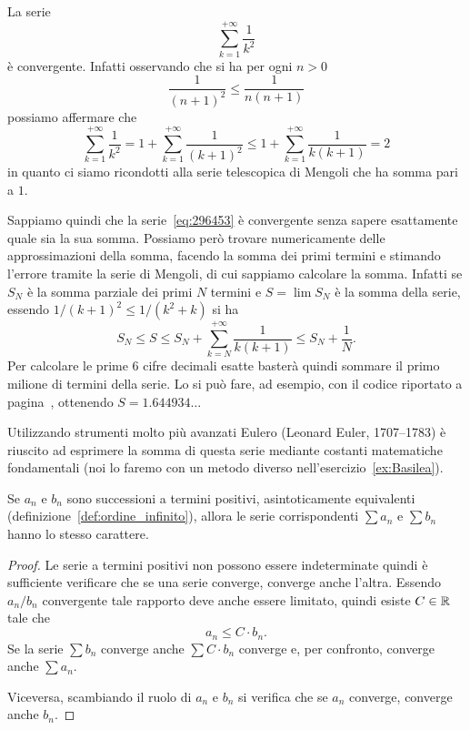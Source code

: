 \begin{example}\label{ex:52573}
\mymark{***}
La serie
\begin{equation}\label{eq:296453}
 \sum_{k=1}^{+\infty} \frac{1}{k^2}
\end{equation}
è convergente.
Infatti osservando che si ha per ogni $n>0$
\[
  \frac{1}{(n+1)^2} \le \frac{1}{n(n+1)}
\]
possiamo affermare che
\[
  \sum_{k=1}^{+\infty} \frac{1}{k^2}
  = 1 + \sum_{k=1}^{+\infty} \frac{1}{(k+1)^2}
  \le 1+ \sum_{k=1}^{+\infty} \frac{1}{k(k+1)}
  = 2
\]
in quanto ci siamo ricondotti alla
serie telescopica di Mengoli che ha somma pari a $1$.

Sappiamo quindi che la serie~\eqref{eq:296453} è convergente
senza sapere esattamente quale sia la sua somma.
Possiamo però trovare numericamente delle approssimazioni
della somma, facendo la somma dei primi termini
e stimando l'errore tramite la serie di Mengoli,
di cui sappiamo calcolare la somma.
Infatti se $S_N$ è la somma parziale dei primi
$N$ termini e $S = \lim S_N$ è la somma della serie,
essendo $1/(k+1)^2 \le 1/(k^2+k)$ si ha
\[
S_N
\le S
\le S_N + \sum_{k=N}^{+\infty} \frac{1}{k(k+1)}
\le S_N + \frac{1}{N}.
\]
Per calcolare le prime 6 cifre decimali esatte basterà
quindi sommare il primo milione di termini della serie.
Lo si può fare, ad esempio, con il codice riportato
a pagina~\pageref{code:series}, ottenendo $S=1.644934\ldots$

Utilizzando strumenti molto più avanzati
Eulero 
(Leonard Euler, 1707--1783) è
riuscito ad esprimere la somma di questa serie mediante costanti matematiche fondamentali
(noi lo faremo con un metodo diverso nell'esercizio~\ref{ex:Basilea}).
\end{example}

\begin{corollary}
\mymark{*}
Se $a_n$ e $b_n$ sono successioni a termini positivi,
asintoticamente equivalenti (definizione~\ref{def:ordine_infinito}),
allora le serie corrispondenti $\sum a_n$ e $\sum b_n$
hanno lo stesso carattere.
\end{corollary}
%
\begin{proof}
\mymark{*}
Le serie a termini positivi non possono essere indeterminate
quindi è sufficiente verificare che se una serie converge, converge anche l'altra.
Essendo $a_n / b_n$ convergente tale rapporto deve anche essere
limitato, quindi esiste $C\in {\mathbb R}$ tale che
\[
   a_n \le C \cdot b_n.
\]
Se la serie $\sum b_n$ converge anche $\sum C \cdot b_n$ converge e, per confronto,
converge anche $\sum a_n$.

Viceversa, scambiando il ruolo di $a_n$ e $b_n$ si verifica che se $a_n$
converge, converge anche $b_n$.
\end{proof}

